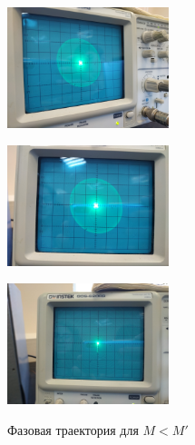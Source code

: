 \begin{center}
    \begin{figure}[H]
        \begin{minipage}{0.32\linewidth}
            \centering
            \includegraphics[height=100pt]{img/1.jpg} 
            \vspace{0pt}
            \label{fig:10}
        \end{minipage}
        \begin{minipage}{0.32\linewidth}
            \centering
            \includegraphics[height=100pt]{img/2.jpg} 
            \vspace{0pt}
            \label{fig:11}
        \end{minipage}
        \begin{minipage}{0.32\linewidth}
            \centering
            \includegraphics[height=100pt]{img/9.jpg} 
            \vspace{0pt}
            \label{fig:12}
        \end{minipage}
    \caption{Фазовая траектория для $M < M'$}
    \vspace{-40pt}
    \end{figure}
\end{center} 
